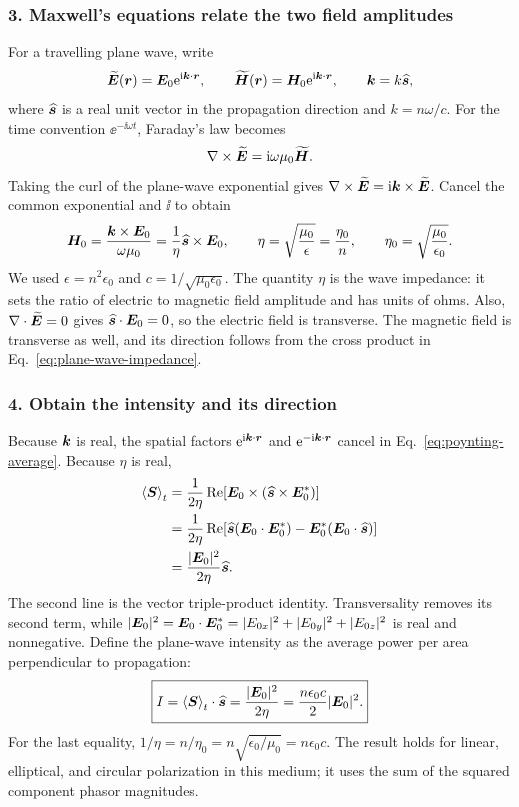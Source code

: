 \subsubsection*{3. Maxwell's equations relate the two field amplitudes}
For a travelling plane wave, write
\[
\widetilde{\bm{E}}(\bm{r})
=\bm{E}_0\mathrm{e}^{\mathrm{i}\bm{k}\cdot\bm{r}},\qquad
\widetilde{\bm{H}}(\bm{r})
=\bm{H}_0\mathrm{e}^{\mathrm{i}\bm{k}\cdot\bm{r}},
\qquad
\bm{k}=k\widehat{\bm{s}},
\]
where $\widehat{\bm{s}}$ is a real unit vector in the propagation direction
and $k=n\omega/c$.
For the time convention $\ee^{-\ii\omega t}$, Faraday's law becomes
\[
\nabla\times\widetilde{\bm{E}}
=\mathrm{i}\omega\mu_0\widetilde{\bm{H}}.
\]
Taking the curl of the plane-wave exponential gives
$\nabla\times\widetilde{\bm{E}}
=\mathrm{i}\bm{k}\times\widetilde{\bm{E}}$.
Cancel the common exponential and $\ii$ to obtain
\begin{equation}
\bm{H}_0
=\frac{\bm{k}\times\bm{E}_0}{\omega\mu_0}
=\frac{1}{\eta}\widehat{\bm{s}}\times\bm{E}_0,
\qquad
\eta=\sqrt{\frac{\mu_0}{\epsilon}}
=\frac{\eta_0}{n},\qquad
\eta_0=\sqrt{\frac{\mu_0}{\epsilon_0}}.
\label{eq:plane-wave-impedance}
\end{equation}
We used $\epsilon=n^2\epsilon_0$ and
$c=1/\sqrt{\mu_0\epsilon_0}$.
The quantity $\eta$ is the wave impedance: it sets the ratio of electric
to magnetic field amplitude and has units of ohms.
Also, $\nabla\cdot\widetilde{\bm{E}}=0$ gives
$\widehat{\bm{s}}\cdot\bm{E}_0=0$, so the electric field is transverse.
The magnetic field is transverse as well, and its direction follows from
the cross product in Eq.~\eqref{eq:plane-wave-impedance}.

\subsubsection*{4. Obtain the intensity and its direction}
Because $\bm{k}$ is real, the spatial factors
$\mathrm{e}^{\mathrm{i}\bm{k}\cdot\bm{r}}$ and
$\mathrm{e}^{-\mathrm{i}\bm{k}\cdot\bm{r}}$ cancel in
Eq.~\eqref{eq:poynting-average}. Because $\eta$ is real,
\begin{align*}
\left\langle \bm{S}\right\rangle_t
&=\frac{1}{2\eta}
\operatorname{Re}\!\left[\bm{E}_0\times
             (\widehat{\bm{s}}\times\bm{E}_0^*)\right]\\
&=\frac{1}{2\eta}
\operatorname{Re}\!\left[
\widehat{\bm{s}}(\bm{E}_0\cdot\bm{E}_0^*)
-\bm{E}_0^*(\bm{E}_0\cdot\widehat{\bm{s}})\right]\\
&=\frac{|\bm{E}_0|^2}{2\eta}\widehat{\bm{s}}.
\end{align*}
The second line is the vector triple-product identity.
Transversality removes its second term, while
$|\bm{E}_0|^2=\bm{E}_0\cdot\bm{E}_0^*
=|E_{0x}|^2+|E_{0y}|^2+|E_{0z}|^2$ is real and nonnegative.
Define the plane-wave intensity as the average power per area
perpendicular to propagation:
\begin{equation}
\boxed{
I=\left\langle \bm{S}\right\rangle_t\cdot\widehat{\bm{s}}
=\frac{|\bm{E}_0|^2}{2\eta}
=\frac{n\epsilon_0c}{2}|\bm{E}_0|^2.}
\label{eq:plane-wave-intensity}
\end{equation}
For the last equality,
$1/\eta=n/\eta_0=n\sqrt{\epsilon_0/\mu_0}=n\epsilon_0c$.
The result holds for linear, elliptical, and circular polarization in
this medium; it uses the sum of the squared component phasor magnitudes.

